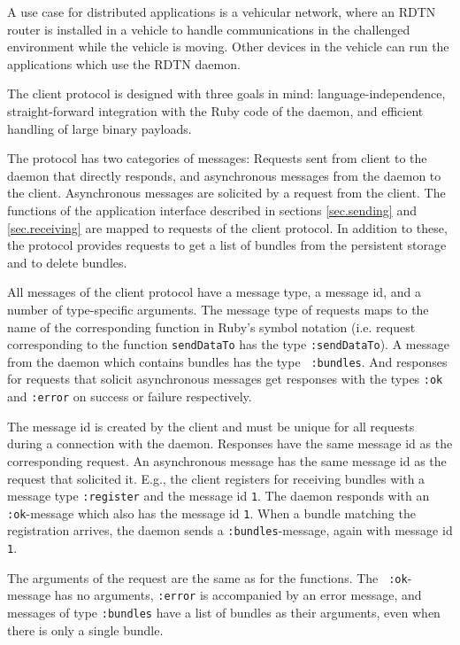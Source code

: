 \documentclass[a4paper]{article}
\begin{document}
A use case for distributed applications is a vehicular network, where an RDTN
router is installed in a vehicle to handle communications in the challenged
environment while the vehicle is moving. Other devices in the vehicle can run
the applications which use the RDTN daemon.

The client protocol is designed with three goals in mind: language-independence,
straight-forward integration with the Ruby code of the daemon, and efficient
handling of large binary payloads. 

The protocol has two categories of messages: Requests sent from client to the
daemon that directly responds, and asynchronous messages from the daemon to the
client. Asynchronous messages are solicited by a request from the client. The
functions of the application interface described in sections \ref{sec.sending}
and \ref{sec.receiving} are mapped to requests of the client protocol. In
addition to these, the protocol provides requests to get a list of bundles from
the persistent storage and to delete bundles.

All messages of the client protocol have a message type, a message id, and a
number of type-specific arguments. The message type of requests maps to the name
of the corresponding function in Ruby's symbol notation (i.e. request
corresponding to the function {\tt sendDataTo} has the type {\tt :sendDataTo}).
A message from the daemon which contains bundles has the type {\tt
:bundles}. And responses for requests that solicit asynchronous messages get
responses with the types {\tt :ok} and {\tt :error} on success or failure
respectively.

The message id is created by the client and must be unique for all requests
during a connection with the daemon. Responses have the same message id as the
corresponding request. An asynchronous message has the same message id as the
request that solicited it. E.g., the client registers for receiving bundles with
a message type {\tt :register} and the message id {\tt 1}. The daemon responds
with an {\tt :ok}-message which also has the message id {\tt 1}. When a bundle
matching the registration arrives, the daemon sends a {\tt :bundles}-message,
again with message id {\tt 1}.

The arguments of the request are the same as for the functions. The {\tt
:ok}-message has no arguments, {\tt :error} is accompanied by an error message,
and messages of type {\tt :bundles} have a list of bundles as their arguments,
even when there is only a single bundle.
\end{document}
